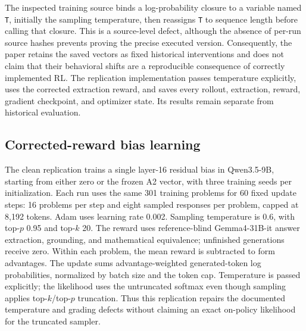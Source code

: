 The inspected training source binds a log-probability closure to a variable named \texttt{T}, initially the sampling temperature, then reassigns \texttt{T} to sequence length before calling that closure. This is a source-level defect, although the absence of per-run source hashes prevents proving the precise executed version. Consequently, the paper retains the saved vectors as fixed historical interventions and does not claim that their behavioral shifts are a reproducible consequence of correctly implemented RL. The replication implementation passes temperature explicitly, uses the corrected extraction reward, and saves every rollout, extraction, reward, gradient checkpoint, and optimizer state. Its results remain separate from historical evaluation.

\begin{table}[t]
\centering\small
\caption{Eligible outcome-prediction tests and distribution of held-out increments. Ranges describe estimates across eligible model--family cells, not confidence intervals. The companion outcome table gives each estimate, 95\% interval, covariates, eligibility status, and adjusted $q$ value. No amount or timing test meets both the interval and FDR criteria.}
\label{tab:outcomes}
\end{table}

\subsection{Corrected-reward bias learning}
\label{app:clean-rl}
The clean replication trains a single layer-16 residual bias in Qwen3.5-9B, starting from either zero or the frozen A2 vector, with three training seeds per initialization. Each run uses the same 301 training problems for 60 fixed update steps: 16 problems per step and eight sampled responses per problem, capped at 8,192 tokens. Adam uses learning rate 0.002. Sampling temperature is 0.6, with top-$p$ 0.95 and top-$k$ 20. The reward uses reference-blind Gemma4-31B-it answer extraction, grounding, and mathematical equivalence; unfinished generations receive zero. Within each problem, the mean reward is subtracted to form advantages. The update sums advantage-weighted generated-token log probabilities, normalized by batch size and the token cap. Temperature is passed explicitly; the likelihood uses the untruncated softmax even though sampling applies top-$k$/top-$p$ truncation. Thus this replication repairs the documented temperature and grading defects without claiming an exact on-policy likelihood for the truncated sampler.

